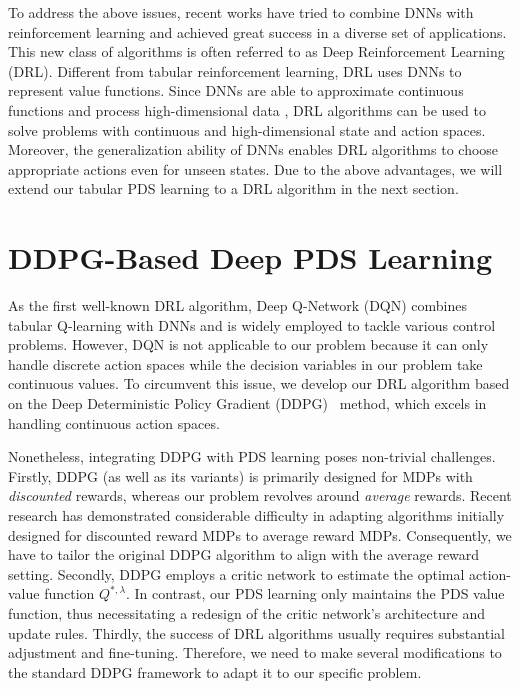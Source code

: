 \documentclass[lettersize, journal]{IEEEtran}
\begin{document}
To address the above issues,
recent works \cite{mnih2013playing, lillicrap2015continuous, mnih2016asynchronous} have tried to combine
DNNs with reinforcement learning and achieved great success in a diverse set of applications.
This new class of algorithms is often referred to as Deep Reinforcement Learning (DRL).
Different from tabular reinforcement learning, DRL uses DNNs to represent value functions.
Since DNNs are able to approximate continuous functions and process high-dimensional data \cite{sarker2021deep}, 
DRL algorithms can be used to solve problems with continuous and high-dimensional state and action spaces.
Moreover, the generalization ability of DNNs enables DRL algorithms to 
choose appropriate actions even for unseen states.
Due to the above advantages, we will extend our tabular PDS learning to a DRL algorithm in the next section.


\section{DDPG-Based Deep PDS Learning} \label{section:dpds}
As the first well-known DRL algorithm, Deep Q-Network (DQN) \cite{mnih2013playing} combines tabular Q-learning
with DNNs and is widely employed to tackle various control problems.
However, DQN is not applicable to our problem because it can only handle discrete action spaces while the decision variables
in our problem take continuous values.
To circumvent this issue, we develop our DRL algorithm based on the Deep Deterministic Policy Gradient (DDPG)~\cite{lillicrap2015continuous} method, which excels in handling continuous action spaces.

Nonetheless, integrating DDPG with PDS learning poses non-trivial challenges.
Firstly, DDPG (as well as its variants) is primarily designed for MDPs with \textit{discounted} rewards, whereas our problem revolves around \textit{average} rewards.
Recent research \cite{xu2021optimal, naik2019discounted} has demonstrated considerable difficulty in adapting algorithms initially designed for discounted reward MDPs to average reward MDPs. Consequently, we have to tailor the original DDPG algorithm to align with the average reward setting.
Secondly, DDPG employs a critic network to estimate the optimal action-value function $Q^{*,\lambda}$. 
In contrast, our PDS learning only maintains the PDS value function, thus necessitating a redesign of the critic network's architecture and update rules.
Thirdly, the success of DRL algorithms usually requires substantial adjustment and fine-tuning.
Therefore, we need to make several modifications to the standard DDPG framework to adapt it to our specific problem.
\end{document}
